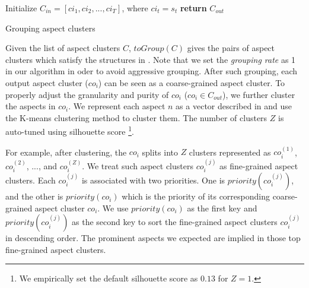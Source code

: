 \begin{algorithm}[!th]
	\small
	\BlankLine
	Initialize $C_{in}=[ci_1, ci_2, ..., ci_T]$, where $ci_t = s_t$\;
	{\bf return} $C_{out}$\;
	\caption{Grouping aspect clusters\label{alg:grouping}}
\end{algorithm}

Given the list of aspect clusters $C$, 
$toGroup(C)$ gives the pairs of aspect clusters which
satisfy the structures in .
Note that we set the \textit{grouping rate} as 1 in our algorithm
in oder to avoid aggressive grouping.
After such grouping, each output aspect cluster ($co_{i}$)
can be seen as a coarse-grained aspect cluster.
To properly adjust the granularity and purity of $co_{i}$ 
($co_{i} \in C_{out}$),
we further cluster the aspects in $co_i$.
We represent each aspect $n$ as a vector described
in 
and use the K-means clustering method 
to cluster them.
The number of clusters $Z$ is auto-tuned using
silhouette score \cite{rousseeuw1987silhouettes}
\footnote{We empirically set the default silhouette score as $0.13$ for $Z=1$.}.

For example, after clustering, 
the $co_i$ splits into $Z$ clusters represented as
$co_i^{(1)}$, $co_i^{(2)}$, ..., 
and $co_i^{(Z)}$.
We treat such aspect clusters $co_i^{(j)}$ as 
fine-grained aspect clusters.
Each $co_i^{(j)}$ is associated with two priorities.
One is $priority(co_i^{(j)})$,
and the other is $priority(co_i)$ 
which is the priority of its corresponding
coarse-grained aspect cluster $co_i$.
We use $priority(co_i)$ as the first key and 
$priority(co_i^{(j)})$ as the second key to
sort the fine-grained aspect clusters $co_i^{(j)}$ in descending order.
The prominent aspects we expected are implied in those top 
fine-grained aspect clusters.

